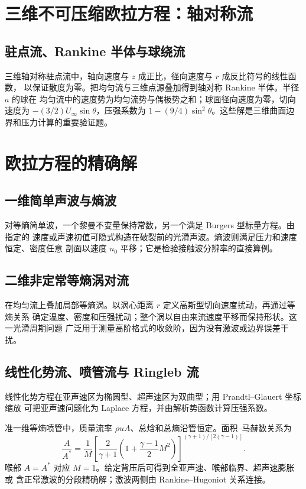 \documentclass[11pt,a4paper,openany,fontset=none]{ctexbook}
\begin{document}
\section{三维不可压缩欧拉方程：轴对称流}
\subsection{驻点流、Rankine 半体与球绕流}
三维轴对称驻点流中，轴向速度与 $z$ 成正比，径向速度与 $r$ 成反比符号的线性函数，
以保证散度为零。把均匀流与三维点源叠加得到轴对称 Rankine 半体。半径 $a$ 的球在
均匀流中的速度势为均匀流势与偶极势之和；球面径向速度为零，切向速度为
$-(3/2)U_\infty\sin\theta$，压强系数为
$1-(9/4)\sin^2\theta$。这些解是三维曲面边界和压力计算的重要验证题。

\section{欧拉方程的精确解}
\subsection{一维简单声波与熵波}
对等熵简单波，一个黎曼不变量保持常数，另一个满足 Burgers 型标量方程。由指定的
速度或声速初值可隐式构造在破裂前的光滑声波。熵波则满足压力和速度恒定、密度任意
剖面以速度 $u_0$ 平移；它是检验接触波分辨率的直接算例。

\subsection{二维非定常等熵涡对流}
在均匀流上叠加局部等熵涡。以涡心距离 $r$ 定义高斯型切向速度扰动，再通过等熵关系
确定温度、密度和压强扰动；整个涡以自由来流速度平移而保持形状。这一光滑周期问题
广泛用于测量高阶格式的收敛阶，因为没有激波或边界误差干扰。

\subsection{线性化势流、喷管流与 Ringleb 流}
线性化势方程在亚声速区为椭圆型、超声速区为双曲型；用 Prandtl--Glauert 坐标缩放
可把亚声速问题化为 Laplace 方程，并由解析势函数计算压强系数。

准一维等熵喷管中，质量流率 $\rho uA$、总焓和总熵沿管恒定。面积--马赫数关系为
\begin{equation}
 \frac{A}{A^*}=\frac1M\left[\frac{2}{\gamma+1}
 \left(1+\frac{\gamma-1}{2}M^2\right)\right]^{(\gamma+1)/[2(\gamma-1)]}.
\end{equation}
喉部 $A=A^*$ 对应 $M=1$。给定背压后可得到全亚声速、喉部临界、超声速膨胀或
含正常激波的分段精确解；激波两侧由 Rankine--Hugoniot 关系连接。
\end{document}
